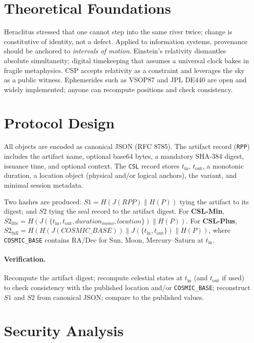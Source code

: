 \documentclass[11pt]{article}
\begin{document}
\section{Theoretical Foundations}
Heraclitus stressed that one cannot step into the same river twice; change is constitutive of identity, not a defect. Applied to information systems, provenance should be anchored to \emph{intervals of motion}. Einstein's relativity dismantles absolute simultaneity; digital timekeeping that assumes a universal clock bakes in fragile metaphysics. CSP accepts relativity as a constraint and leverages the sky as a public witness. Ephemerides such as VSOP87 and JPL DE440 are open and widely implemented; anyone can recompute positions and check consistency.

\section{Protocol Design}
All objects are encoded as canonical JSON (RFC 8785). The artifact record (\texttt{RPP}) includes the artifact name, optional base64 bytes, a mandatory SHA-384 digest, issuance time, and optional context. The \texttt{CSL} record stores $t_{\text{in}}$, $t_{\text{out}}$, a monotonic duration, a location object (physical and/or logical anchors), the variant, and minimal session metadata.

Two hashes are produced: \(S1 = H(J(RPP)\parallel H(P))\) tying the artifact to its digest; and \(S2\) tying the seal record to the artifact digest. For \textbf{CSL-Min}, \(S2_{\text{lite}} = H(J(\{t_{\text{in}},t_{\text{out}},duration_{mono},location\})\parallel H(P))\). For \textbf{CSL-Plus}, \(S2_{\text{full}} = H(H(J(COSMIC\_BASE))\parallel J(\{t_{\text{in}},t_{\text{out}}\})\parallel H(P))\), where \texttt{COSMIC\_BASE} contains RA/Dec for Sun, Moon, Mercury--Saturn at \(t_{\text{in}}\).

\paragraph{Verification.} Recompute the artifact digest; recompute celestial states at $t_{\text{in}}$ (and $t_{\text{out}}$ if used) to check consistency with the published location and/or \texttt{COSMIC\_BASE}; reconstruct \(S1\) and \(S2\) from canonical JSON; compare to the published values.

\section{Security Analysis}
\end{document}

